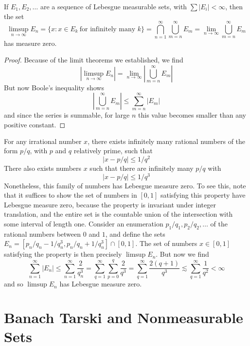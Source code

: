 \begin{lemma}
  If $E_1, E_2, \dots$ are a sequence of Lebesgue measurable sets, with $\sum |E_i| < \infty$, then the set
  \[ \limsup_{n \to \infty} E_n = \{ x: x \in E_k\ \text{for infinitely many $k$} \} = \bigcap_{n = 1}^\infty \bigcup_{m = n}^\infty E_m = \lim_{n \to \infty} \bigcup_{m = n}^\infty E_m \]
  has measure zero.
\end{lemma}
\begin{proof}
  Because of the limit theorems we established, we find
  \[ \left| \limsup_{n \to \infty} E_n \right| = \lim_{n \to \infty} \left| \bigcup_{m = n}^\infty E_m \right| \]
  But now Boole's inequality shows
  \[ \left| \bigcup_{m = n}^\infty E_m \right| \leq \sum_{m = n}^\infty |E_m| \]
  and since the series is summable, for large $n$ this value becomes smaller than any positive constant.
\end{proof}

\begin{example}
  For any irrational number $x$, there exists infinitely many rational numbers of the form $p/q$, with $p$ and $q$ relatively prime, such that
  \[ |x - p/q| \leq 1/q^2 \]
  There also exists numbers $x$ such that there are infinitely many $p/q$ with
  \[ |x - p/q| \leq 1/q^3 \]
  Nonetheless, this family of numbers has Lebesgue measure zero. To see this, note that it suffices to show the set of numbers in $[0,1]$ satisfying this property have Lebesgue measure zero, because the property is invariant under integer translation, and the entire set is the countable union of the intersection with some interval of length one. Consider an enumeration $p_1/q_1, p_2/q_2, \dots$ of the rational numbers between $0$ and $1$, and define the sets $E_n = [p_n/q_n - 1/q_n^3, p_n/q_n + 1/q_n^3] \cap [0,1]$. The set of numbers $x \in [0,1]$ satisfying the property is then precisely $\limsup E_n$. But now we find
  \[ \sum_{n = 1}^\infty |E_n| \leq \sum_{n = 1}^\infty \frac{2}{q_n^3} = \sum_{q = 1}^\infty \sum_{p = 0}^q \frac{2}{q^3} = \sum_{q = 1}^\infty \frac{2(q+1)}{q^3} \lesssim \sum_{q = 1}^\infty \frac{1}{q^2} < \infty \]
  and so $\limsup E_n$ has Lebesgue measure zero.
\end{example}

\section{Banach Tarski and Nonmeasurable Sets}

